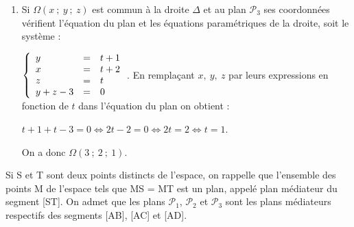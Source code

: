 \begin{enumerate}
\begin{enumerate}
$\left\{\begin{array}{l c l}
t + 2 - 1 &=&y\\
x &=&t + 2\\
z&=&t
\end{array}\right. 
\iff \left\{\begin{array}{l c l}
y&=&t + 1\\
x &=&t + 2\\
z&=&t
\end{array}\right.$, avec $t \in \R$.
	\end{enumerate}
\item  %

Si $\Omega(x~;~y~;~z)$ est commun à la droite $\Delta$ et au plan $\mathcal{P}_3$ ses coordonnées vérifient l'équation du plan et les équations paramétriques de la droite, soit le système :

$\left\{\begin{array}{l c l}
y&=&t + 1\\
x &=&t + 2\\
z&=&t\\
y + z - 3&=&0
\end{array}\right.$. En remplaçant $x,\:y,\:z$ par leurs expressions en fonction de $t$ dans l'équation du plan on obtient :

$t + 1 + t - 3= 0 \iff 2t - 2 = 0 \iff 2t = 2 \iff t = 1$.

On a donc $\Omega\left(3~;~2~;~1 \right)$.
\end{enumerate}

\medskip

Si S et T sont deux points distincts de l'espace, on rappelle que l'ensemble des points M de l'espace tels que MS = MT est un plan, appelé plan médiateur du segment [ST]. On admet que les plans $\mathcal{P}_1$,\: $\mathcal{P}_2$ et $\mathcal{P}_3$ sont les plans médiateurs respectifs des segments [AB], [AC] et [AD].

